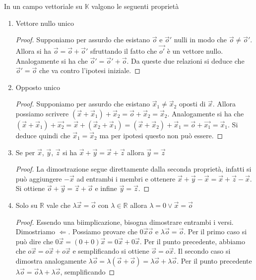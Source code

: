 In un campo vettoriale su $\mathbb{K}$ valgono le seguenti proprietà
\begin{enumerate}
  \item Vettore nullo unico
    \begin{proof}
      Supponiamo per assurdo che esistano $\vec{o}$ e $\vec{o}'$ nulli in modo che
      $\vec{o}\neq\vec{o}'$. Allora si ha $\vec{o}=\vec{o}+\vec{o}'$ sfruttando il fatto
      che $\vec{o'}$ è un vettore nullo. Analogamente si ha che
      $\vec{o}'=\vec{o}'+\vec{o}$. Da queste due relazioni si deduce che
      $\vec{o}'=\vec{o}$ che va contro l'ipotesi iniziale.
    \end{proof}
  \item Opposto unico
    \begin{proof}
      Supponiamo per assurdo che esistano $\vec{x}_1\neq\vec{x}_2$ oposti di $\vec{x}$.
      Allora possiamo scrivere $(\vec{x}+\vec{x}_1)+\vec{x}_2 =
      \vec{o}+\vec{x}_2=\vec{x}_2$. Analogamente si ha che
      $(\vec{x}+\vec{x}_1)+\vec{x_2}=\vec{x}+(\vec{x}_2+\vec{x}_1)=(\vec{x}+\vec{x}_2)
      +\vec{x}_1=\vec{o}+\vec{x_1}=\vec{x}_1$. Si deduce quindi che
      $\vec{x}_1=\vec{x}_2$ ma per ipotesi questo non può essere.
    \end{proof}
  \item Se per $\vec{x}$, $\vec{y}$, $\vec{z}$ si ha $\vec{x}+\vec{y}=\vec{x}+\vec{z}$
    allora $\vec{y}=\vec{z}$
    \begin{proof}
      La dimostrazione segue direttamente dalla seconda proprietà, infatti si può
      aggiungere $-\vec{x}$ ad entrambi i membri e ottenere
      $\vec{x}+\vec{y}-\vec{x}=\vec{x}+\vec{z}-\vec{x}$. Si ottiene
      $\vec{o}+\vec{y}=\vec{z}+\vec{o}$ e infine $\vec{y}=\vec{z}$.
    \end{proof}
  \item Solo su $\mathbb{R}$ vale che $\lambda\vec{x}=\vec{o}$ con
    $\lambda\in\mathbb{R}$ allora $\lambda=0\lor\vec{x}=\vec{o}$
    \begin{proof}
      Essendo una biimplicazione, bisogna dimostrare entrambi i versi. Dimostriamo
      $\Leftarrow$. Possiamo provare che $0\vec{x}\vec{o}$ e $\lambda\vec{o}=\vec{o}$.
      Per il primo caso si può dire che $0\vec{x}=(0+0)\vec{x}=0\vec{x}+0\vec{x}$. Per
      il punto precedente, abbiamo che $o\vec{x}=o\vec{x}+o\vec{x}$ e semplificando si
      ottiene $\vec{o}=o\vec{x}$. Il secondo caso si dimostra analogamente
      $\lambda\vec{o}=\lambda(\vec{o}+\vec{o})=\lambda\vec{o}+\lambda\vec{o}$. Per il
      punto precedente $\lambda\vec{o}=\vec{o}\lambda+\lambda\vec{o}$, semplificando

\end{proof}
\end{enumerate}
